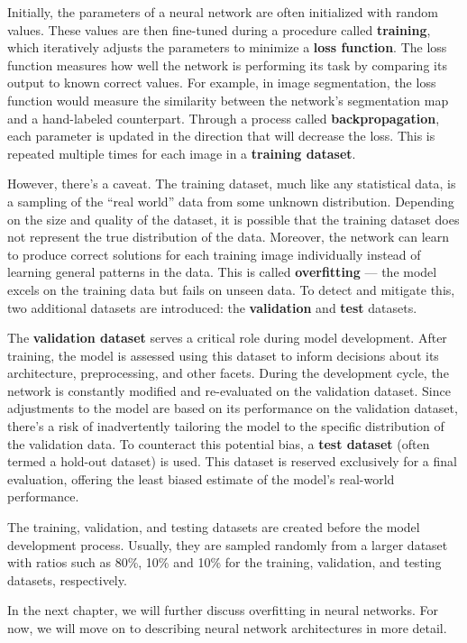 Initially, the parameters of a neural network are often initialized with random values. These values are then fine-tuned during a procedure called \textbf{training}, which iteratively adjusts the parameters to minimize a \textbf{loss function}. The loss function measures how well the network is performing its task by comparing its output to known correct values. For example, in image segmentation, the loss function would measure the similarity between the network's segmentation map and a hand-labeled counterpart. Through a process called \textbf{backpropagation}, each parameter is updated in the direction that will decrease the loss. This is repeated multiple times for each image in a \textbf{training dataset}.

However, there's a caveat. The training dataset, much like any statistical data, is a sampling of the ``real world'' data from some unknown distribution. Depending on the size and quality of the dataset, it is possible that the training dataset does not represent the true distribution of the data. Moreover, the network can learn to produce correct solutions for each training image individually instead of learning general patterns in the data. This is called \textbf{overfitting} --- the model excels on the training data but fails on unseen data. To detect and mitigate this, two additional datasets are introduced: the \textbf{validation} and \textbf{test} datasets.

The \textbf{validation dataset} serves a critical role during model development. After training, the model is assessed using this dataset to inform decisions about its architecture, preprocessing, and other facets. During the development cycle, the network is constantly modified and re-evaluated on the validation dataset. Since adjustments to the model are based on its performance on the validation dataset, there's a risk of inadvertently tailoring the model to the specific distribution of the validation data. To counteract this potential bias, a \textbf{test dataset} (often termed a hold-out dataset) is used. This dataset is reserved exclusively for a final evaluation, offering the least biased estimate of the model's real-world performance.

The training, validation, and testing datasets are created before the model development process. Usually, they are sampled randomly from a larger dataset with ratios such as 80\%, 10\% and 10\% for the training, validation, and testing datasets, respectively. 

In the next chapter, we will further discuss overfitting in neural networks. For now, we will move on to describing neural network architectures in more detail.

